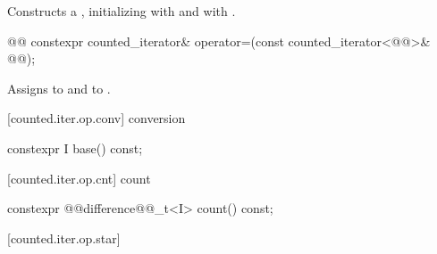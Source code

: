\begin{addedblock}
\begin{itemdescr}
\pnum
\effects Constructs a , initializing
 with  and
 with .
\end{itemdescr}

%
%
\begin{itemdecl}
@@
  constexpr counted_iterator& operator=(const counted_iterator<@@>& @@);
\end{itemdecl}

\begin{itemdescr}
\pnum
\effects Assigns  to
 and  to .
\end{itemdescr}

[counted.iter.op.conv]{ conversion}

%
%
\begin{itemdecl}
constexpr I base() const;
\end{itemdecl}

\begin{itemdescr}
\pnum
{}

\pnum
{}
\end{itemdescr}

[counted.iter.op.cnt]{ count}

%
%
\begin{itemdecl}
constexpr @@difference@@_t<I> count() const;
\end{itemdecl}

\begin{itemdescr}
\pnum
{}

\pnum
{}
\end{itemdescr}

[counted.iter.op.star]{}


\end{addedblock}
